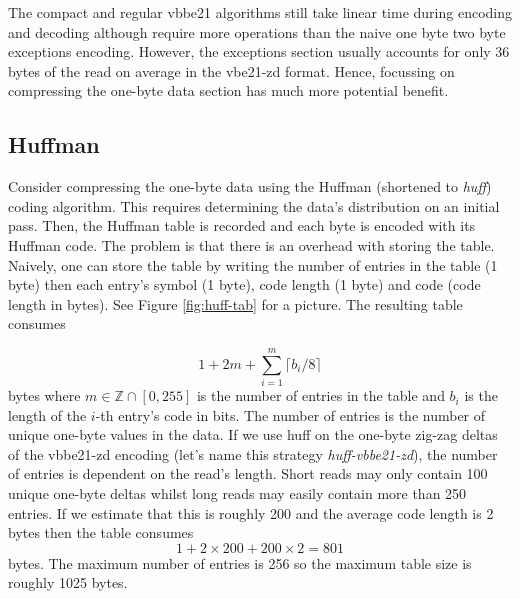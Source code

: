 



The compact and regular vbbe21 algorithms still take linear time during encoding
and decoding although require more operations than the naive one byte two byte
exceptions encoding. However, the exceptions section usually accounts for only
36 bytes of the read on average in the vbe21-zd format. Hence, focussing on
compressing the one-byte data section has much more potential benefit.


\subsection{Huffman}

Consider compressing the one-byte data using the Huffman
(shortened to \textit{huff}) coding algorithm. This requires determining the
data's distribution on an initial pass. Then, the Huffman table is
recorded and each byte is encoded with its Huffman code. The problem is that
there is an overhead with storing the table.  Naively, one can store the table
by writing the number of entries in the table (1 byte) then each entry's symbol
(1 byte), code length (1 byte) and code (code length in bytes). See Figure
\ref{fig:huff-tab} for a picture. The resulting
table consumes

\[ 1 + 2m + \sum_{i=1}^m\lceil b_i / 8 \rceil \]
bytes where $m\in\mathbb{Z}\cap[0,255]$ is the number of entries in the table
and $b_i$ is the length of the $i$-th entry's code in bits. The number of
entries is the number of unique one-byte values in the data.
If we use huff on the one-byte zig-zag deltas of the vbbe21-zd encoding (let's name this strategy
\textit{huff-vbbe21-zd}), the number of entries is
dependent on the read's length. Short reads may only contain 100 unique one-byte
deltas whilst long reads may easily contain more than 250 entries. If we
estimate that this is roughly 200 and the average code length is 2 bytes then
the table consumes
\[ 1 + 2\times 200 + 200\times 2 = 801 \]
bytes. The maximum number of entries is 256 so the maximum table size is roughly
1025 bytes.

